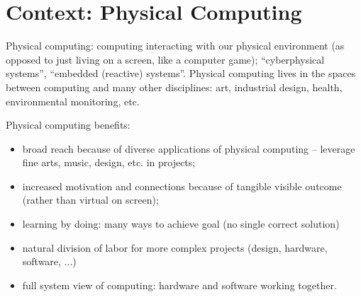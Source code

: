 \section{Context: Physical Computing}
\label{sec:domain}

Physical computing: computing interacting with our physical environment (as opposed to just
living on a screen, like a computer game); ``cyberphysical systems'', ``embedded (reactive) systems''.
Physical computing lives in the spaces between computing and many other disciplines:
art, industrial design, health, environmental monitoring, etc.


Physical computing benefits:
\begin{itemize}
\item broad reach because of diverse applications of physical computing -- leverage fine arts, music, design, etc. in projects;
\item increased motivation and connections because of tangible visible outcome (rather than virtual on screen);
\item learning by doing: many ways to achieve goal (no single correct solution)
\item natural division of labor for more complex projects (design, hardware, software, ...)
\item full system view of computing: hardware and software working together.
\end{itemize}


